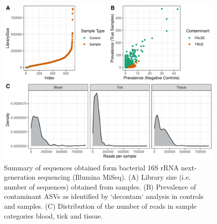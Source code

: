 \documentclass[a4paper, nobind]{templates/ociamthesis}
\begin{document}
\begin{figure}
\includegraphics[width=0.95\linewidth]{figures/ms-figs-appendix/FigA-3.1} \caption[Summary of sequences obtained from bacterial 16S rRNA metabarcoding]{Summary of sequences obtained form bacterial 16S rRNA next-generation sequencing (Illumina MiSeq). (A) Library size (i.e. number of sequences) obtained from samples. (B) Prevalence of contaminant ASVs as identified by `decontam` analysis in controls and samples. (C) Distribution of the number of reads in sample categories blood, tick and tissue.}\label{fig:FA31}
\end{figure}

\newpage
\end{document}
